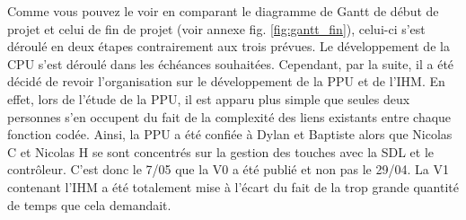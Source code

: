 Comme vous pouvez le voir en comparant le diagramme de Gantt de début de projet et celui de fin de projet (voir annexe fig. \ref{fig:gantt_fin}), celui-ci s'est déroulé en deux étapes contrairement aux trois prévues. Le développement de la CPU s'est déroulé dans les échéances souhaitées. Cependant, par la suite, il a été décidé de revoir l'organisation sur le développement de la PPU et de l'IHM. En effet, lors de l'étude de la PPU, il est apparu plus simple que seules deux personnes s'en occupent du fait de la complexité des liens existants entre chaque fonction codée. Ainsi, la PPU a été confiée à Dylan et Baptiste alors que Nicolas C et Nicolas H se sont concentrés sur la gestion des touches avec la SDL et le contrôleur. C'est donc le 7/05 que la V0 a été publié et non pas le 29/04. La V1 contenant l'IHM a été totalement mise à l'écart du fait de la trop grande quantité de temps que cela demandait.
